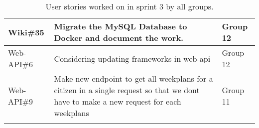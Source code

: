 \begin{longtable}{|p{2.9cm}|p{8cm}|p{2cm}|}
    Wiki\#35         & Migrate the MySQL Database to Docker and document the work.                                                                                                                            & Group 12           \\ \hline
    Web-API\#6      & Considering updating frameworks in web-api                                                                                                                                            & Group 12       \\ \hline
    Web-API\#9      & Make new endpoint to get all weekplans for a citizen in a single request so that we dont have to make a new request for each weekplans                                                & Group 11           \\ \hline
    \caption{User stories worked on in sprint 3 by all groups.}\label{table:user-stories-sprint-3}
\end{longtable}

